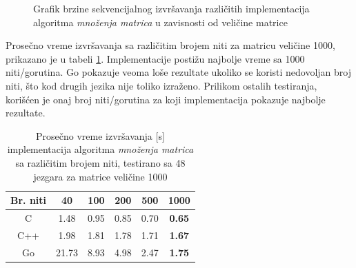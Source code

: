 \documentclass[12pt,oneside]{memoir}
\begin{document}
\begin{figure}
\begin{center}


\caption{Grafik brzine sekvencijalnog izvršavanja različitih implementacija algoritma \textit{množenja matrica} u zavisnosti od veličine matrice}
\label{fig:matrix11}
\end{center}
\end{figure}

Prosečno vreme izvršavanja sa različitim brojem niti za matricu veličine 1000, prikazano je u tabeli \ref{tab:matrix5}. Implementacije postižu najbolje vreme sa 1000 niti/gorutina. Go pokazuje veoma loše rezultate ukoliko se koristi nedovoljan broj niti, što kod drugih jezika nije toliko izraženo. Prilikom ostalih testiranja, korišćen je onaj broj niti/gorutina za koji implementacija pokazuje najbolje rezultate. 

\begin{table}
\begin{center}
\caption{Prosečno vreme izvršavanja [s] implementacija algoritma \textit{množenja matrica} sa različitim brojem niti, testirano sa 48 jezgara za matrice veličine 1000}
\begin{tabular}{||c||c c c c c||}
\hline
Br. niti		&40&100 &200 &500 &1000\\ \hline
C		&1.48		&0.95		&0.85		&0.70		&\textbf{0.65} \\ \hline
C++ 		&1.98		&1.81		&1.78		&1.71		&\textbf{1.67} \\ \hline
Go		&21.73	&8.93		&4.98		&2.47		&\textbf{1.75} \\ \hline
\end{tabular}
\label{tab:matrix5}
\end{center}
\end{table}
\end{document}
